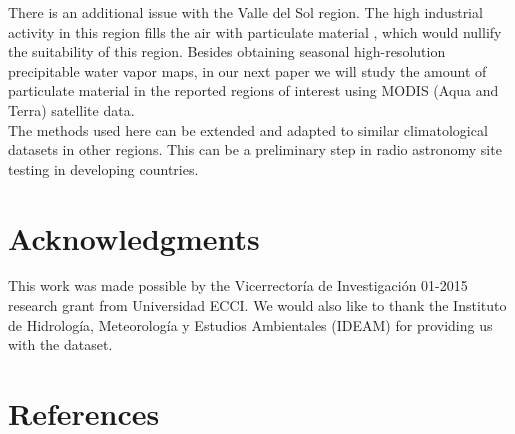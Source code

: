 \documentclass[12pt]{iopart}
\begin{document}
There is an additional issue with the Valle del Sol region. The high industrial activity in this region fills the air with particulate material \cite{sogphd,sogamoso}, which would nullify the suitability of this region. Besides obtaining seasonal high-resolution precipitable water vapor maps, in our next paper we will study the amount of particulate material in the reported regions of interest using MODIS (Aqua and Terra) satellite data.\\
  
The methods used here can be extended and adapted to similar climatological datasets in other regions. This can be a preliminary step in radio astronomy site testing in developing countries.

\section*{Acknowledgments}

This work was made possible by the Vicerrector\'ia de Investigaci\'on 01-2015 research grant from Universidad ECCI. We would also like to thank the Instituto de Hidrolog\'ia, Meteorolog\'ia y Estudios Ambientales (IDEAM) for providing us with the dataset.


 \section*{References}
 

  
  
\end{document}
